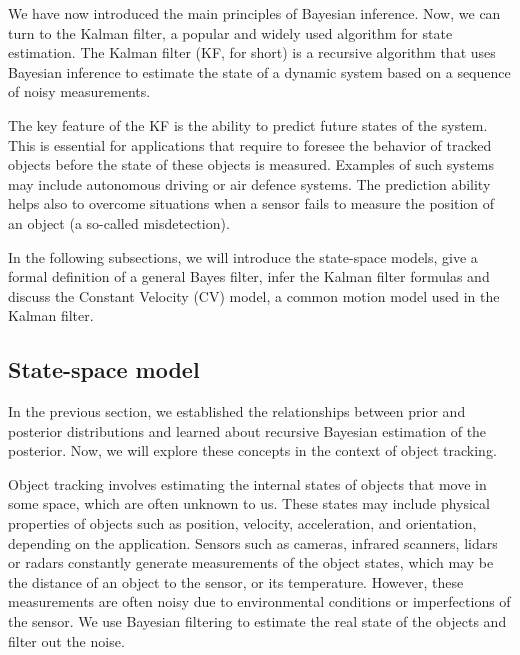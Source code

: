 
We have now introduced the main principles of Bayesian inference. Now, we can
turn to the Kalman filter, a popular and widely used algorithm for state 
estimation. The Kalman filter (KF, for short) is a recursive algorithm that uses
Bayesian inference to estimate the state of a dynamic system based on a sequence
of noisy measurements.

The key feature of the KF is the ability to predict future states of the system.
This is essential for applications that require to foresee the behavior of
tracked objects before the state of these objects is measured. Examples of such
systems may include autonomous driving or air defence systems. The prediction 
ability helps also to overcome situations when a sensor fails to measure the
position of an object (a so-called misdetection).

In the following subsections, we will introduce the state-space models, give
a formal definition of a general Bayes filter, infer the Kalman filter formulas
and discuss the Constant Velocity (CV) model, a common motion model used in the
Kalman filter.

\subsection{State-space model}\label{sec:state-model}

In the previous section, we established the relationships between prior and 
posterior distributions and learned about recursive Bayesian estimation of the 
posterior. Now, we will explore these concepts in the context of object 
tracking.

Object tracking involves estimating the internal states of objects that move in 
some space, which are often unknown to us. These states may include physical 
properties of objects such as position, velocity, acceleration, and 
orientation, depending on the application. Sensors such as cameras, infrared 
scanners, lidars or radars constantly generate measurements of the object 
states, which may be the distance of an object to the sensor, or its 
temperature. However, these measurements are often noisy due to environmental 
conditions or imperfections of the sensor. We use Bayesian filtering to 
estimate the real state of the objects and filter out the noise.

